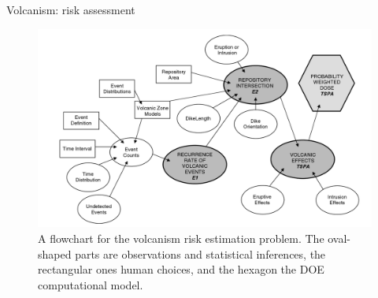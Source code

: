 \documentclass[10pt]{beamer}
\begin{document}
	\begin{frame}{Volcanism: risk assessment}
    \centering
        \begin{figure}
		\includegraphics[height=0.6\textheight]{volcano}
        \caption*{A flowchart for the volcanism risk estimation problem. The oval-shaped parts are observations and statistical inferences, the rectangular ones human choices, and the hexagon the DOE computational model. \cite{me06}}
		\end{figure}
    \end{frame}
\end{document}
